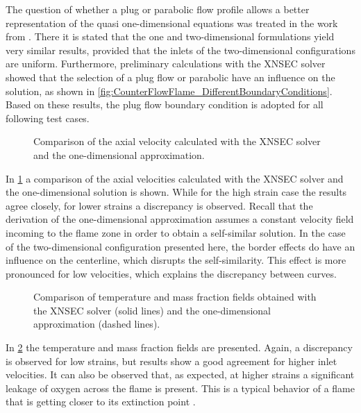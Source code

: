 The question of whether a plug or parabolic flow profile allows a better representation of the quasi one-dimensional equations was treated in the work from \textcite{frouzakisTwodimensionalDirectNumerical1998}. There it is stated that the one and two-dimensional  formulations yield very similar results, provided that the inlets of the two-dimensional configurations are uniform. Furthermore, preliminary calculations with the XNSEC solver showed that the selection of a plug flow or parabolic have an influence on the solution, as shown in \cref{fig:CounterFlowFlame_DifferentBoundaryConditions}. Based on these results, the plug flow boundary condition is adopted for all following test cases.

\begin{figure}[t]
	\centering
	\caption{Comparison of the axial velocity calculated with the XNSEC solver and the one-dimensional approximation.}
	\label{fig:BoSSS_1D_Comparison_velocity}
\end{figure}
 In \cref{fig:BoSSS_1D_Comparison_velocity} a comparison of the axial velocities calculated with the XNSEC solver and the one-dimensional solution is shown. While for the high strain case the results agree closely, for lower strains a discrepancy is observed. Recall that the derivation of the one-dimensional approximation assumes a constant velocity field incoming to the flame zone in order to obtain a self-similar solution. In the case of the two-dimensional configuration presented here, the border effects do have an influence on the centerline, which disrupts the self-similarity. This effect is more pronounced for low velocities, which explains the discrepancy between curves.
 
 
 \tikzexternaldisable
 \begin{figure}[p]
 	\centering
 	\caption[Comparison of temperature and mass fraction fields obtained with the XNSEC solver and the one-dimensional approximation.]{Comparison of temperature and mass fraction fields obtained with the XNSEC solver (solid lines) and the one-dimensional approximation (dashed lines).}
 	\label{fig:BoSSS_1D_Comparison}
 \end{figure}
 \tikzexternalenable
In \cref{fig:BoSSS_1D_Comparison} the temperature and mass fraction fields are presented. Again, a discrepancy is observed for low strains, but results show a good agreement for higher inlet velocities. It can also be observed that, as expected, at higher strains a significant leakage of oxygen across the flame is present. This is a typical behavior of a flame that is getting closer to its extinction point \parencite{fernandez-tarrazoSimpleOnestepChemistry2006}.  

